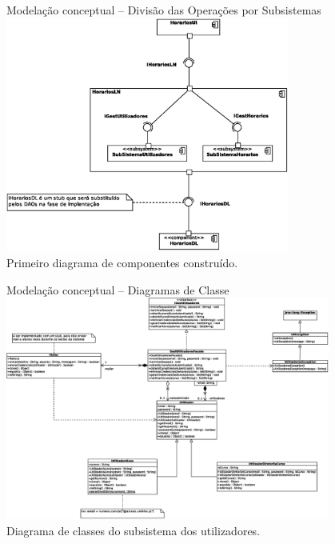 \documentclass[13pt, handout]{beamer}
\begin{document}
\begin{frame}{\large Modelação conceptual -- Divisão das Operações por Subsistemas}
    \centering
    \includegraphics[width=0.7\textwidth]{Imagens/Modelos/Componentes.svg.eps} \\
    {\scriptsize Primeiro diagrama de componentes construído.}
\end{frame}

\begin{frame}{Modelação conceptual -- Diagramas de Classe}
    \centering
    \includegraphics[width=0.8\textwidth]{Imagens/Modelos/Utilizadores.svg.eps} \\
    {\scriptsize Diagrama de classes do subsistema dos utilizadores.}
\end{frame}
\end{document}
